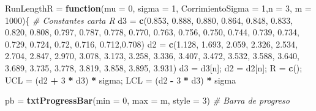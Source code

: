 \documentclass{article}
\newenvironment{Shaded}{\begin{snugshade}}{\end{snugshade}}
\newcommand{\AttributeTok}[1]{\textcolor[rgb]{0.13,0.29,0.53}{#1}}
\newcommand{\CommentTok}[1]{\textcolor[rgb]{0.56,0.35,0.01}{\textit{#1}}}
\newcommand{\ControlFlowTok}[1]{\textcolor[rgb]{0.13,0.29,0.53}{\textbf{#1}}}
\newcommand{\DecValTok}[1]{\textcolor[rgb]{0.00,0.00,0.81}{#1}}
\newcommand{\FloatTok}[1]{\textcolor[rgb]{0.00,0.00,0.81}{#1}}
\newcommand{\FunctionTok}[1]{\textcolor[rgb]{0.13,0.29,0.53}{\textbf{#1}}}
\newcommand{\NormalTok}[1]{#1}
\newcommand{\OtherTok}[1]{\textcolor[rgb]{0.56,0.35,0.01}{#1}}
\newcommand{\SpecialCharTok}[1]{\textcolor[rgb]{0.81,0.36,0.00}{\textbf{#1}}}
\begin{document}
\begin{Shaded}
\begin{Highlighting}[]
\NormalTok{RunLengthR }\OtherTok{=} \ControlFlowTok{function}\NormalTok{(}\AttributeTok{mu =} \DecValTok{0}\NormalTok{, }\AttributeTok{sigma =} \DecValTok{1}\NormalTok{, }\AttributeTok{CorrimientoSigma =} \DecValTok{1}\NormalTok{,}\AttributeTok{n =} \DecValTok{3}\NormalTok{, }\AttributeTok{m =} \DecValTok{1000}\NormalTok{)\{}
  \CommentTok{\# Constantes carta R}
\NormalTok{  d3 }\OtherTok{=} \FunctionTok{c}\NormalTok{(}\FloatTok{0.853}\NormalTok{, }\FloatTok{0.888}\NormalTok{, }\FloatTok{0.880}\NormalTok{, }\FloatTok{0.864}\NormalTok{, }\FloatTok{0.848}\NormalTok{, }\FloatTok{0.833}\NormalTok{, }\FloatTok{0.820}\NormalTok{, }\FloatTok{0.808}\NormalTok{, }\FloatTok{0.797}\NormalTok{, }\FloatTok{0.787}\NormalTok{, }\FloatTok{0.778}\NormalTok{, }\FloatTok{0.770}\NormalTok{,}
         \FloatTok{0.763}\NormalTok{, }\FloatTok{0.756}\NormalTok{, }\FloatTok{0.750}\NormalTok{, }\FloatTok{0.744}\NormalTok{, }\FloatTok{0.739}\NormalTok{, }\FloatTok{0.734}\NormalTok{, }\FloatTok{0.729}\NormalTok{, }\FloatTok{0.724}\NormalTok{, }\FloatTok{0.72}\NormalTok{, }\FloatTok{0.716}\NormalTok{, }\FloatTok{0.712}\NormalTok{,}\FloatTok{0.708}\NormalTok{)}
\NormalTok{  d2 }\OtherTok{=} \FunctionTok{c}\NormalTok{(}\FloatTok{1.128}\NormalTok{, }\FloatTok{1.693}\NormalTok{, }\FloatTok{2.059}\NormalTok{, }\FloatTok{2.326}\NormalTok{, }\FloatTok{2.534}\NormalTok{, }\FloatTok{2.704}\NormalTok{, }\FloatTok{2.847}\NormalTok{, }\FloatTok{2.970}\NormalTok{, }\FloatTok{3.078}\NormalTok{, }\FloatTok{3.173}\NormalTok{, }\FloatTok{3.258}\NormalTok{, }\FloatTok{3.336}\NormalTok{, }
         \FloatTok{3.407}\NormalTok{, }\FloatTok{3.472}\NormalTok{, }\FloatTok{3.532}\NormalTok{, }\FloatTok{3.588}\NormalTok{, }\FloatTok{3.640}\NormalTok{, }\FloatTok{3.689}\NormalTok{, }\FloatTok{3.735}\NormalTok{, }\FloatTok{3.778}\NormalTok{, }\FloatTok{3.819}\NormalTok{, }\FloatTok{3.858}\NormalTok{, }\FloatTok{3.895}\NormalTok{, }\FloatTok{3.931}\NormalTok{)}
\NormalTok{  d3 }\OtherTok{=}\NormalTok{ d3[n]; d2 }\OtherTok{=}\NormalTok{ d2[n]; R }\OtherTok{=} \FunctionTok{c}\NormalTok{(); UCL }\OtherTok{=}\NormalTok{ (d2 }\SpecialCharTok{+} \DecValTok{3} \SpecialCharTok{*}\NormalTok{ d3) }\SpecialCharTok{*}\NormalTok{ sigma; LCL }\OtherTok{=}\NormalTok{ (d2 }\SpecialCharTok{{-}} \DecValTok{3} \SpecialCharTok{*}\NormalTok{ d3) }\SpecialCharTok{*}\NormalTok{ sigma}

\NormalTok{  pb }\OtherTok{=} \FunctionTok{txtProgressBar}\NormalTok{(}\AttributeTok{min =} \DecValTok{0}\NormalTok{, }\AttributeTok{max =}\NormalTok{ m, }\AttributeTok{style =} \DecValTok{3}\NormalTok{) }\CommentTok{\# Barra de progreso}
  

\end{Highlighting}
\end{Shaded}
\end{document}
